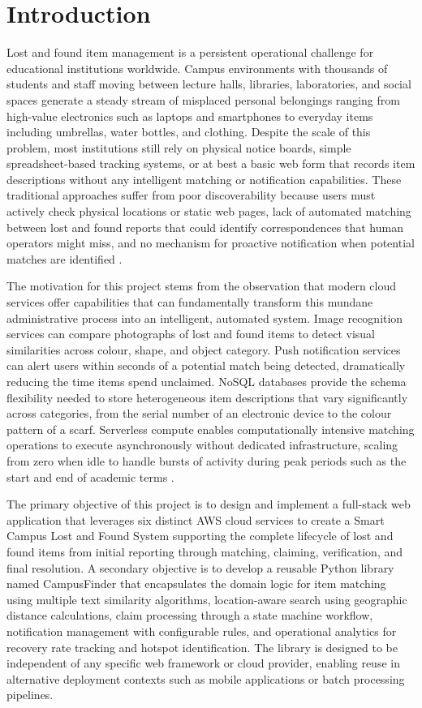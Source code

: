 \documentclass[conference]{IEEEtran}
\begin{document}
\section{Introduction}

Lost and found item management is a persistent operational challenge for educational institutions worldwide. Campus environments with thousands of students and staff moving between lecture halls, libraries, laboratories, and social spaces generate a steady stream of misplaced personal belongings ranging from high-value electronics such as laptops and smartphones to everyday items including umbrellas, water bottles, and clothing. Despite the scale of this problem, most institutions still rely on physical notice boards, simple spreadsheet-based tracking systems, or at best a basic web form that records item descriptions without any intelligent matching or notification capabilities. These traditional approaches suffer from poor discoverability because users must actively check physical locations or static web pages, lack of automated matching between lost and found reports that could identify correspondences that human operators might miss, and no mechanism for proactive notification when potential matches are identified \cite{cicd}.

The motivation for this project stems from the observation that modern cloud services offer capabilities that can fundamentally transform this mundane administrative process into an intelligent, automated system. Image recognition services can compare photographs of lost and found items to detect visual similarities across colour, shape, and object category. Push notification services can alert users within seconds of a potential match being detected, dramatically reducing the time items spend unclaimed. NoSQL databases provide the schema flexibility needed to store heterogeneous item descriptions that vary significantly across categories, from the serial number of an electronic device to the colour pattern of a scarf. Serverless compute enables computationally intensive matching operations to execute asynchronously without dedicated infrastructure, scaling from zero when idle to handle bursts of activity during peak periods such as the start and end of academic terms \cite{cloudnative}.

The primary objective of this project is to design and implement a full-stack web application that leverages six distinct AWS cloud services to create a Smart Campus Lost and Found System supporting the complete lifecycle of lost and found items from initial reporting through matching, claiming, verification, and final resolution. A secondary objective is to develop a reusable Python library named CampusFinder that encapsulates the domain logic for item matching using multiple text similarity algorithms, location-aware search using geographic distance calculations, claim processing through a state machine workflow, notification management with configurable rules, and operational analytics for recovery rate tracking and hotspot identification. The library is designed to be independent of any specific web framework or cloud provider, enabling reuse in alternative deployment contexts such as mobile applications or batch processing pipelines.
\end{document}
